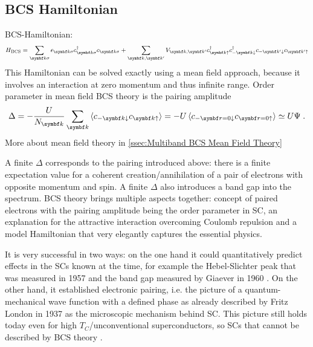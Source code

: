 \documentclass[../notes.tex]{subfiles}
\begin{document}
\subsection*{BCS Hamiltonian}


BCS-Hamiltonian:
\begin{equation}\label{eq:BCS Hamiltonian}
	H_{\text{BCS}} = \sum_{\vb{k}\sigma} \epsilon_{\vb{k}\sigma} c_{\vb{k}\sigma}^{\dagger} c_{\vb{k}\sigma} + \sum_{\vb{k}, \vb{k}^{\prime}} V_{\vb{k}, \vb{k}^{\prime}} c_{\vb{k}\uparrow}^{\dagger} c_{-\vb{k}\downarrow}^{\dagger} c_{-\vb{k}^{\prime}\downarrow} c_{\vb{k}^{\prime}\uparrow}
\end{equation}
This Hamiltonian can be solved exactly using a mean field approach, because it involves an interaction at zero momentum and thus infinite range.
Order parameter in mean field BCS theory is the pairing amplitude
\begin{equation}
	\Delta = - \frac{U}{N_{\vb{k}}} \sum_{\vb{k}} \braket{c_{-\vb{k} \downarrow} c_{\vb{k} \uparrow}} = - U \braket{c_{-\vb{r}=0 \downarrow} c_{\vb{r=0} \uparrow}} \simeq U \Psi \;.
\end{equation}
More about mean field theory in \cref{ssec:Multiband BCS Mean Field Theory}

A finite \(\Delta\) corresponds to the pairing introduced above: there is a finite expectation value for a coherent creation/annihilation of a pair of electrons with opposite momentum and spin.
A finite \(\Delta\) also introduces a band gap into the spectrum.
BCS theory brings multiple aspects together: concept of paired electrons with the pairing amplitude being the order parameter in SC, an explanation for the attractive interaction overcoming Coulomb repulsion and a model Hamiltonian that very elegantly captures the essential physics.

It is very successful in two ways: on the one hand it could quantitatively predict effects in the SCs known at the time, for example the Hebel-Slichter peak that was measured in 1957 \cite{hebelNuclearRelaxationSuperconducting1957, hebelNuclearSpinRelaxation1959} and the band gap measured by Giaever in 1960 \cite{giaeverStudySuperconductorsElectron1961}.  
On the other hand, it established electronic pairing, i.e. the picture of a quantum-mechanical wave function with a defined phase as already described by Fritz London in 1937 \cite{londonNewConceptionSupraconductivity1937} as the microscopic mechanism behind SC.
This picture still holds today even for high \(T_C\)/unconventional superconductors, so SCs that cannot be described by BCS theory \cite{zhouHightemperatureSuperconductivity2021}.
\end{document}

